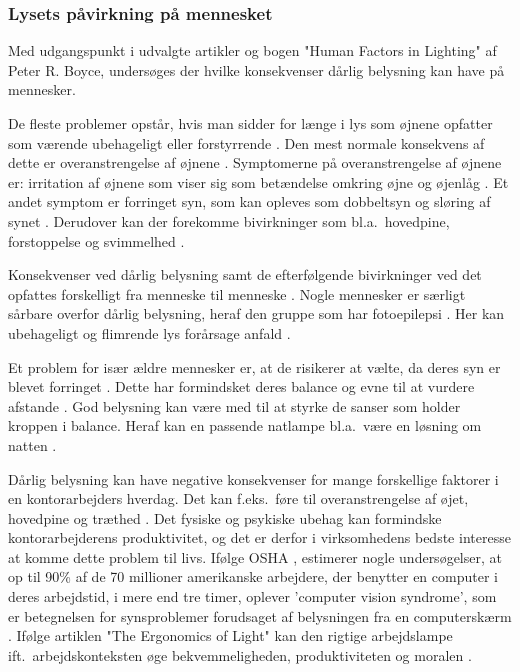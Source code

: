 \subsubsection{Lysets påvirkning på mennesket} 
\label{sec:konsekvenser}

Med udgangspunkt i udvalgte artikler og bogen "Human Factors in Lighting" af Peter R. Boyce, undersøges der hvilke konsekvenser dårlig belysning kan have på mennesker. 

De fleste problemer opstår, hvis man sidder for længe i lys som øjnene opfatter som værende ubehageligt eller forstyrrende \cite{human_factors}. Den mest normale konsekvens af dette er overanstrengelse af øjnene \cite{human_factors}. Symptomerne på overanstrengelse af øjnene er: irritation af øjnene som viser sig som betændelse omkring øjne og øjenlåg \cite{human_factors}. Et andet symptom er forringet syn, som kan opleves som dobbeltsyn og sløring af synet \cite{human_factors}. Derudover kan der forekomme bivirkninger som bl.a.\ hovedpine, forstoppelse og svimmelhed \cite{human_factors}.

Konsekvenser ved dårlig belysning samt de efterfølgende bivirkninger ved det opfattes forskelligt fra menneske til menneske \cite{human_factors}. Nogle mennesker er særligt sårbare overfor dårlig belysning, heraf den gruppe som har fotoepilepsi \cite{human_factors}. Her kan ubehageligt og flimrende lys forårsage anfald \cite{human_factors}. 

Et problem for især ældre mennesker er, at de risikerer at vælte, da deres syn er blevet forringet \cite{human_factors}. Dette har formindsket deres balance og evne til at vurdere afstande \cite{human_factors}. God belysning kan være med til at styrke de sanser som holder kroppen i balance. Heraf kan en passende natlampe bl.a.\ være en løsning om natten \cite{human_factors}. 

Dårlig belysning kan have negative konsekvenser for mange forskellige faktorer i en kontorarbejders hverdag. Det kan f.eks.\ føre til overanstrengelse af øjet, hovedpine og træthed \cite{ergonomi_arbejdsplads}. Det fysiske og psykiske ubehag kan formindske kontorarbejderens produktivitet, og det er derfor i virksomhedens bedste interesse at komme dette problem til livs. Ifølge OSHA \cite{ergonomi_arbejdsplads}, estimerer nogle undersøgelser, at op til 90\% af de 70 millioner amerikanske arbejdere, der benytter en computer i deres arbejdstid, i mere end tre timer, oplever 'computer vision syndrome', som er betegnelsen for synsproblemer forudsaget af belysningen fra en computerskærm \cite{CVS}. Ifølge artiklen "The Ergonomics of Light" kan den rigtige arbejdslampe ift.\ arbejdskonteksten øge bekvemmeligheden, produktiviteten og moralen \cite{ergonomi_arbejdsplads}. 